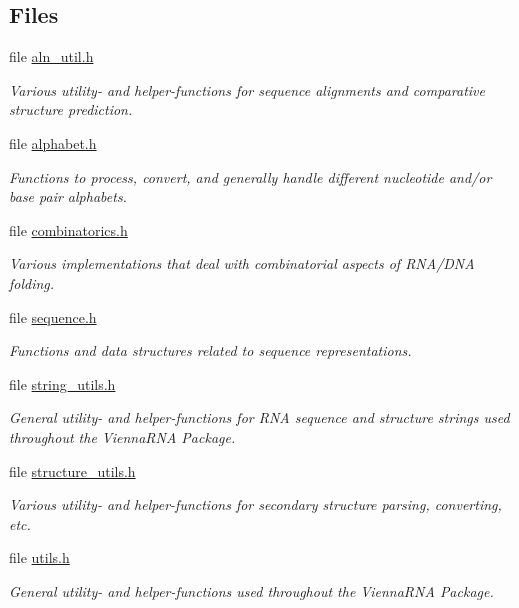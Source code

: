 \subsection*{Files}
\begin{DoxyCompactItemize}
\item 
file \hyperlink{aln__util_8h}{aln\+\_\+util.\+h}
\begin{DoxyCompactList}\small\item\em Various utility-\/ and helper-\/functions for sequence alignments and comparative structure prediction. \end{DoxyCompactList}\item 
file \hyperlink{alphabet_8h}{alphabet.\+h}
\begin{DoxyCompactList}\small\item\em Functions to process, convert, and generally handle different nucleotide and/or base pair alphabets. \end{DoxyCompactList}\item 
file \hyperlink{combinatorics_8h}{combinatorics.\+h}
\begin{DoxyCompactList}\small\item\em Various implementations that deal with combinatorial aspects of R\+N\+A/\+D\+NA folding. \end{DoxyCompactList}\item 
file \hyperlink{sequence_8h}{sequence.\+h}
\begin{DoxyCompactList}\small\item\em Functions and data structures related to sequence representations. \end{DoxyCompactList}\item 
file \hyperlink{string__utils_8h}{string\+\_\+utils.\+h}
\begin{DoxyCompactList}\small\item\em General utility-\/ and helper-\/functions for R\+NA sequence and structure strings used throughout the Vienna\+R\+NA Package. \end{DoxyCompactList}\item 
file \hyperlink{structure__utils_8h}{structure\+\_\+utils.\+h}
\begin{DoxyCompactList}\small\item\em Various utility-\/ and helper-\/functions for secondary structure parsing, converting, etc. \end{DoxyCompactList}\item 
file \hyperlink{utils_8h}{utils.\+h}
\begin{DoxyCompactList}\small\item\em General utility-\/ and helper-\/functions used throughout the {\itshape Vienna\+R\+NA} {\itshape Package}. \end{DoxyCompactList}\end{DoxyCompactItemize}
